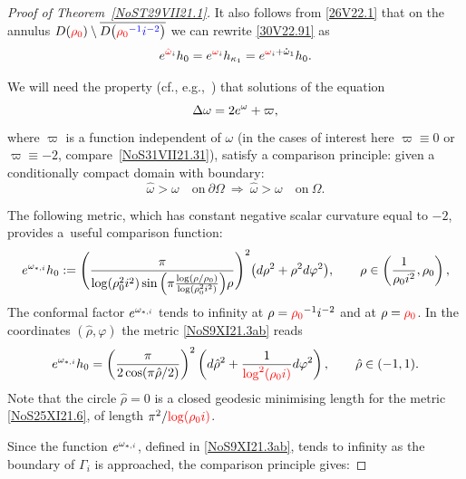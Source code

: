 \documentclass[10pt,a4paper]{article}
\numberwithin{equation}{section}
\newcommand{\blue}[1]{{\color{blue}#1}}
\newcommand{\hato}{\red{\omega}}
\newcommand{\hmv}{\red{\hat \omega}}
\newcommand{\hrho}{\hat\rho}
\newcommand{\mv}{\omega}%
\newcommand{\red}[1]{{\color{red}#1}}
\newcommand{\rhozero}{\red{\rho_0}}
\begin{document}
\begin{proof}[Proof of Theorem~\ref{NoST29VII21.1}]
It also follows from \eqref{26V22.1} that on the annulus $D(\rhozero )
 \setminus \overline{D\big(\blue{\rhozero^{-1} i^{-2}}\big)}$
we can rewrite \eqref{30V22.91} as
 \begin{equation*}%
 {\rm e}^{\hmv_i} h_0
 = {\rm e}^{\hato_i} h_{\kappa_1}
 = {\rm e}^{\hato_i + \mathring \omega_1} h_{0}.
 \end{equation*}

We will need the property (cf., e.g.,~\cite{MazzeoTaylor}) that solutions of the equation
\begin{equation*}%
 \Delta \mv= 2 {\rm e}^{\mv} +\varpi,
\end{equation*}
where $\varpi$ is a function independent of $\mv$ (in the cases of interest here $\varpi\equiv 0$ or $\varpi\equiv-2$, compare~\eqref{NoS31VII21.31}),
satisfy a comparison principle: given a conditionally compact domain with boundary:
\begin{equation*}%
 \hat \mv > \mv \quad \text{on} \ \partial\Omega
 \
 \Longrightarrow
 \
 \hat \mv > \mv \quad \text{on} \ \Omega.
\end{equation*}

The following metric, which has constant negative scalar curvature equal to $-2$, provides a~useful comparison function:
\begin{equation}
 \label{NoS9XI21.3ab}
 {\rm e}^{\mv_{*,i}} h_0 :=
\Bigg(
 \frac{\pi }{
 \log (\rho_0^2i^2) \sin\Big( \pi \frac{\log (\rho/\rho_0) }{\log (\rho_0^2i^2)}\Big) \rho}
\Bigg)^2 \big({\rm d}\rho^2+\rho^2 {\rm d}\varphi^2\big), \qquad
 \rho\in \left(\frac1{\rho_0i^2},\rho_0 \right),
\end{equation}
The conformal factor ${\rm e}^{\mv_{*,i}}$ tends to infinity at $\rho=\rhozero^{-1} i^{-2}$ and at $\rho=\rhozero $.
In the coordinates $(\hat \rho, \varphi)$ the metric \eqref{NoS9XI21.3ab} reads
\begin{equation}
 \label{NoS25XI21.6}
 {\rm e}^{\mv_{*,i}}h_0 =
\left(
 \frac{\pi }{
 2 \cos( \pi \hrho/2 )
}
 \right)^2 \left({\rm d}\hrho^2+ \frac{1}{\red{\log^2(\rho_0i)}} {\rm d}\varphi^2\right)
, \qquad
 \hrho\in (-1,1).
\end{equation}
Note that the circle $\hrho =0$ is a closed geodesic minimising length for the metric \eqref{NoS25XI21.6}, of length $\pi^2/\red{\log (\rho_0i)}$.

Since the function ${\rm e}^{\mv_{*,i}}$, defined in \eqref{NoS9XI21.3ab}, tends to infinity as the boundary of $\Gamma_i$ is approached, the comparison principle gives:


\end{proof}
\end{document}
